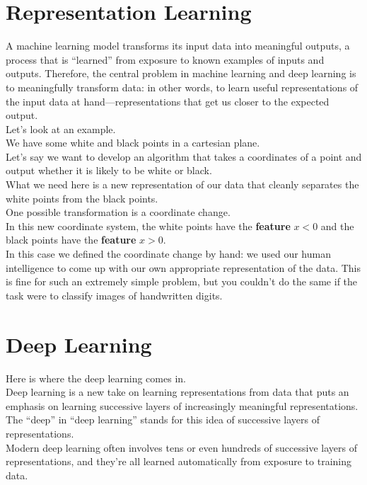 \documentclass{SBCbookchapter}
\begin{document}
\section*{Representation Learning}
A machine learning model transforms its input data
into meaningful outputs, a process that is “learned” 
from exposure to known examples of inputs and outputs. 
Therefore,  the  central  problem  in  machine  learning
and  deep  learning  is  to meaningfully transform  data:
in  other  words,  to  learn  useful representations
of  the  input  data  at hand—representations that 
get us closer to the expected output. \\
Let's look at an example. \\
We have some white and black points in a cartesian plane. \\
Let's say we want to develop an algorithm that takes a coordinates
of a point and output whether it is likely to be white or black. \\
What we need here is a new representation of our data that cleanly 
separates the white points  from  the  black  points. \\
One  possible transformation is a coordinate change. \\
In this new coordinate system, the white points have the \textbf{feature}
$x < 0$ and the black points have the \textbf{feature} $x > 0$. \\
In this case we defined the coordinate change by hand: 
we used our human intelligence to come up with our 
own appropriate representation of the data. This 
is fine for such an extremely simple problem, 
but you couldn't do the same if the task were to 
classify images of handwritten digits.

\section*{Deep Learning}
Here is where the deep learning comes in. \\
Deep learning is a new take on learning representations
from data that puts an emphasis on learning successive
layers of increasingly meaningful representations. \\ 
The “deep” in “deep learning” stands  for this  
idea  of  successive  layers  of  representations. \\
Modern deep learning
often involves tens or even hundreds of successive 
layers of representations, and they’re all learned 
automatically from exposure to training data.
\end{document}
